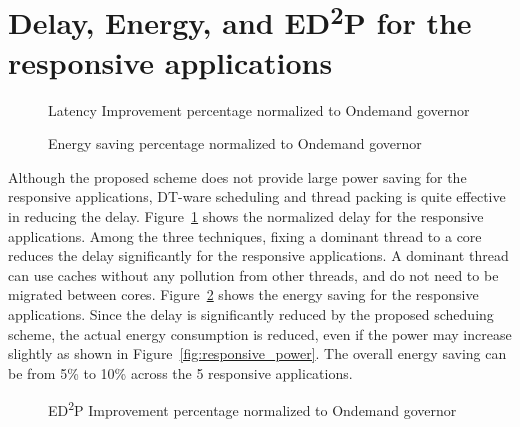 \section{Delay, Energy, and ED\textsuperscript{2}P for the responsive applications}

\begin{figure}[bt]
\begin{center}
\end{center}
\caption{Latency Improvement percentage normalized to Ondemand governor}
\label{fig:responsive_latency_result}
\end{figure}

\begin{figure}[bt]
\begin{center}
\end{center}
\caption{Energy saving percentage normalized to Ondemand governor}
\label{fig:responsive_energy_result}
\end{figure}

Although the proposed scheme does not provide large power saving for the responsive applications, DT-ware scheduling and
thread packing is quite effective in reducing the delay. Figure~\ref{fig:responsive_latency_result} shows 
the normalized delay for the responsive applications. Among the three techniques, fixing a dominant thread to
a core reduces the delay significantly for the responsive applications. A dominant thread can use
caches without any pollution from other threads, and do not need to be migrated between cores.
Figure~\ref{fig:responsive_energy_result} shows the energy saving for the responsive applications. 
Since the delay is significantly reduced by the proposed scheduing scheme, the actual energy consumption
is reduced, even if the power may increase slightly as shown in Figure~\ref{fig:responsive_power}.
The overall energy saving can be from 5\% to 10\% across the 5 responsive applications.

\begin{figure}[bt]
\begin{center}
\end{center}
\caption{ED\textsuperscript{2}P Improvement percentage normalized to Ondemand governor}
\label{fig:responsive_EDP_result}
\end{figure}

